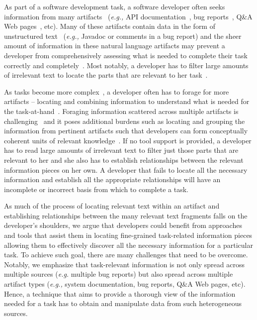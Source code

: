 


As part of a software development task,
a software developer often seeks information from
many artifacts~\cite{Li2013} (\textit{e.g.,} API documentation~\cite{Singer1998, robillard2011field}, bug reports~\cite{Breu2010, Ko2006}, Q\&A Web pages~\cite{umarji2008archetypal, Huang2018}, etc).
Many of these artifacts contain data in the form of unstructured text~\cite{Bavota2016} (\textit{e.g.,} Javadoc or comments in a bug report)
and the sheer amount of information in these natural language artifacts may prevent a developer from comprehensively assessing what is needed to complete their task correctly and completely~\cite{Murphy2005}.
Most notably, a developer has to filter large amounts of irrelevant text to locate the parts that are relevant to her task~\cite{Piorkowski2016}.





As tasks become more complex~\cite{Pirolli2007, Bystrom1995}, a developer often has to forage
for more artifacts --
locating and combining information to understand what is needed for the task-at-hand~\cite{Piorkowski2016}.
Foraging information scattered across multiple artifacts is challenging~\cite{Piorkowski2016, Ponzanelli2015}
and it poses additional burdens such as locating and grouping the information from pertinent artifacts
such that developers can form conceptually coherent units of relevant knowledge~\cite{Starke2009, Ferreira2016}.
If no tool support is provided, a developer has to read large amounts of irrelevant text to filter just those parts that are relevant to her
and she also has to establish relationships between the relevant information pieces on her own.
A developer that fails to locate all the necessary information and establish all the appropriate relationships will have an incomplete or incorrect basis from which to complete a task.






As much of the process of locating relevant text within an artifact and establishing relationships
between the many relevant text fragments falls on the developer's shoulders,
we argue that developers could benefit from approaches and tools that assist them in
locating fine-grained task-related information pieces allowing them to effectively discover all the necessary information for a particular task.
To achieve such goal, there are many challenges that need to be overcome.
Notably, we emphasize that task-relevant information is not only spread across multiple sources (\textit{e.g.} multiple bug reports) but also
spread across multiple artifact types (\textit{e.g.,} system documentation, bug reports, Q\&A Web pages, etc).
Hence, a technique that aims to provide a thorough view of the information needed for a task has to obtain and manipulate data from
such heterogeneous sources.






